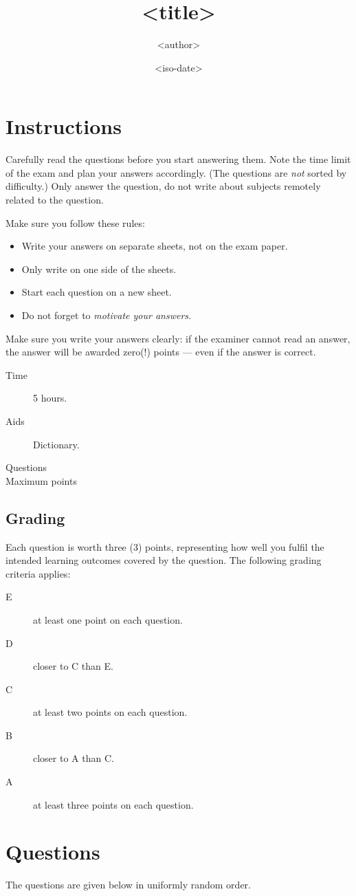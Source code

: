 \documentclass[addpoints]{exam}
\title{<title>}
\date{<iso-date>}
\author{%
  <author>
}
\affil{%
  <affil>
}
\begin{document}
\maketitle
\thispagestyle{foot}

\section*{Instructions}

Carefully read the questions before you start answering them.
Note the time limit of the exam and plan your answers accordingly.
(The questions are \emph{not} sorted by difficulty.)
Only answer the question, do not write about subjects remotely related to the
question.

Make sure you follow these rules:
\begin{itemize}
  \item Write your answers on separate sheets, not on the exam paper.
  \item Only write on one side of the sheets.
  \item Start each question on a new sheet.
  \item Do not forget to \emph{motivate your answers.}
\end{itemize}

Make sure you write your answers clearly: if the examiner cannot read an 
answer, the answer will be awarded zero(!) points --- even if the answer is 
correct.

\begin{description}
  \item[Time] 5 hours.
  \item[Aids] Dictionary.
  \item[Questions] \numquestions
  \item[Maximum points] \numpoints
\end{description}

\subsection*{Grading}

Each question is worth three (3) points, representing how well you fulfil the 
intended learning outcomes covered by the question.
The following grading criteria applies:
\begin{description}
  \item[E] at least one point on each question.
  \item[D] closer to C than E.
  \item[C] at least two points on each question.
  \item[B] closer to A than C.
  \item[A] at least three points on each question.
\end{description}


\clearpage
\section*{Questions}

The questions are given below in uniformly random order.

\begin{questions}
  
\end{questions}


\printbibliography
\end{document}
